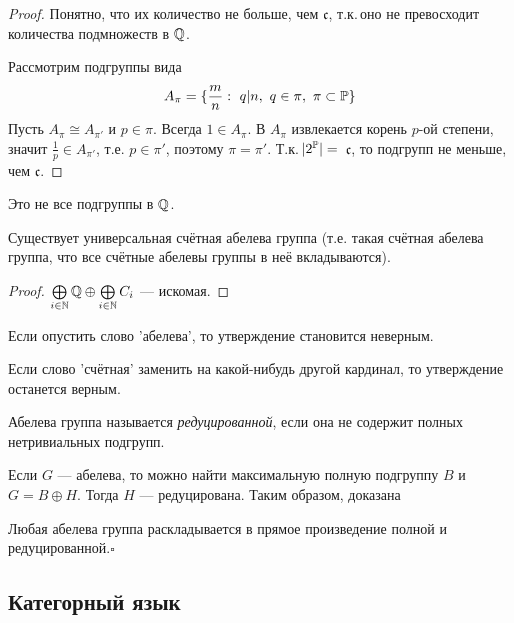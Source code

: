\documentclass[10pt,a4paper]{article}%
\begin{document}
\begin{proof} Понятно, что их количество не больше, чем $\mathfrak{c}$,
т.к.\,оно не превосходит количества подмножеств в $\mathbb Q$.

Рассмотрим подгруппы вида
$$
A_\pi=\{\frac{m}{n}:~q|n,~q\in\pi,~\pi\subset \mathbb P\}
$$
Пусть $A_\pi\cong A_{\pi'}$ и $p\in\pi$. Всегда $1\in A_\pi$. В
$A_\pi$ извлекается корень $p$-ой степени, значит $\frac{1}{p}\in
A_{\pi'}$, т.е. $p\in\pi'$, поэтому $\pi=\pi'$. Т.к.\,$|2^\mathbb P|=\,$
$\mathfrak{c}$, то подгрупп не меньше, чем
$\mathfrak{c}$.\end{proof}

\begin{note}
Это не все подгруппы в $\mathbb Q$.
\end{note}

\begin{theorem}Существует
универсальная счётная абелева группа (т.е. такая счётная абелева группа, что все
счётные абелевы группы в неё вкладываются).
\end{theorem}

\begin{proof}
$\bigoplus\limits_{i\in\mathbb N}\mathbb Q\oplus\bigoplus\limits_{i\in\mathbb N}C_i$
--- искомая.\end{proof}

\begin{note}
Если опустить слово 'абелева', то утверждение становится неверным.
\end{note}

\begin{note}
Если слово 'счётная' заменить на какой-нибудь другой кардинал, то
утверждение останется верным.
\end{note}

Абелева группа называется {\em
редуцированной}, если она не
содержит полных нетривиальных подгрупп.

Если $G$ --- абелева, то можно найти максимальную полную подгруппу
$B$ и $G=B\oplus H$. Тогда $H$ --- редуцирована. Таким образом,
доказана

\begin{theorem}Любая абелева группа раскладывается в
прямое произведение полной и редуцированной.$\square$
\end{theorem}

\subsection{Категорный язык}
\end{document}
